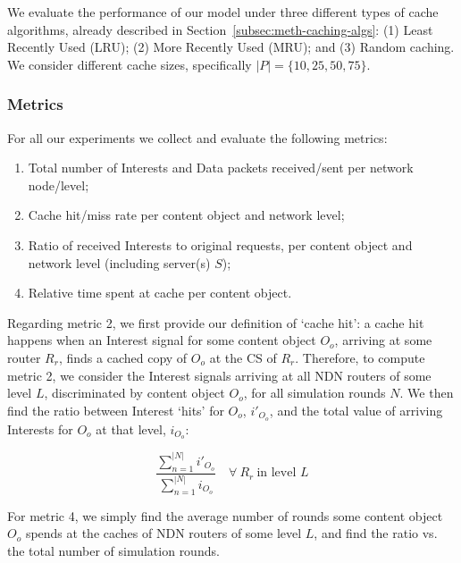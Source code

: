 We evaluate the performance of our model under three different types of cache 
algorithms, already described in Section~\ref{subsec:meth-caching-algs}: (1) 
Least Recently Used (LRU); (2) More Recently Used (MRU); and (3) Random caching. We 
consider different cache sizes, specifically $|P| = \{10, 25, 50, 75\}$.\shortvertbreak

\subsubsection{Metrics}
\label{subsec:exp-setup-metrics}

For all our experiments we collect and evaluate the following metrics:

\begin{enumerate}

    \item Total number of Interests and Data packets received\slash sent per network node\slash level;
    \item Cache hit\slash miss rate per content object and network level;
    \item Ratio of received Interests to original requests, per content object 
        and network level (including server(s) $S$);
    \item Relative time spent at cache per content object.\shortvertbreak

\end{enumerate}

Regarding metric 2, we first provide our definition of `cache hit': a cache hit 
happens when an Interest signal for some content object $O_o$, arriving at some 
router $R_r$, finds a cached copy of $O_o$ at the CS of $R_r$. Therefore, to 
compute metric 2, we consider the Interest signals 
arriving at all NDN routers of some level $L$, discriminated by content 
object $O_o$, for all simulation rounds $N$. We then find the ratio between Interest 
`hits' for $O_o$, $i'_{O_o}$, and the total value of arriving Interests for $O_o$ at that 
level, $i_{O_o}$:

\begin{equation}
    \frac{\sum_{n=1}^{|N|} i'_{O_o}}{\sum_{n=1}^{|N|} i_{O_o}} \quad \forall \ R_r \ \text{in level $L$}
    \label{eq:exp-setup-metrics-2}
\end{equation}\shortvertbreak

For metric 4, we simply find the average number of rounds 
some content object $O_o$ spends at the caches of NDN routers of some level $L$, and find 
the ratio vs. the total number of simulation rounds.

